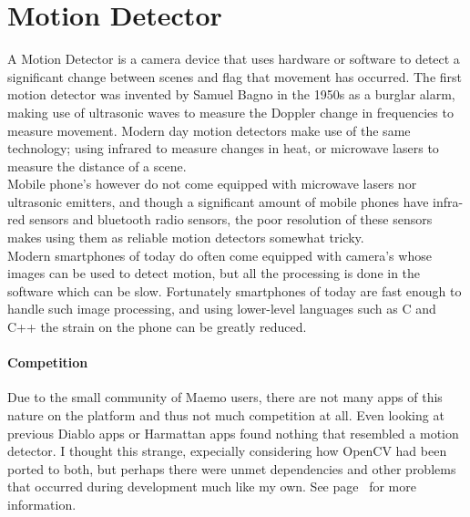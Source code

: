 %
%
%
%
%



\part{Motion Detector}
A Motion Detector is a camera device that uses hardware or software to detect a significant change between scenes and flag that movement has occurred. The first motion detector was invented by Samuel Bagno in the 1950s as a burglar alarm, making use of ultrasonic waves to measure the Doppler change in frequencies to measure movement. Modern day motion detectors make use of the same technology; using infrared to measure changes in heat, or microwave lasers to measure the distance of a scene.\\
Mobile phone's however do not come equipped with microwave lasers nor ultrasonic emitters, and though a significant amount of mobile phones have infra-red sensors and bluetooth radio sensors, the poor resolution of these sensors makes using them as reliable motion detectors somewhat tricky.\\
Modern smartphones of today do often come equipped with camera's whose images can be used to detect motion, but all the processing is done in the software which can be slow. Fortunately smartphones of today are fast enough to handle such image processing, and using lower-level languages such as C and C++ the strain on the phone can be greatly reduced.

\subsection{Competition}
Due to the small community of Maemo users, there are not many apps of this nature on the platform and thus not much competition at all. Even looking at previous Diablo apps or Harmattan apps found nothing that resembled a motion detector. I thought this strange, expecially considering how OpenCV had been ported to both, but perhaps there were unmet dependencies and other problems that occurred during development much like my own. See page~\pageref{opencvdocu} for more information.

